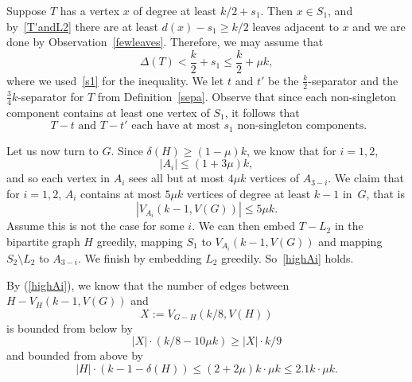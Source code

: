 \documentclass[12pt]{article}
\begin{document}
Suppose $T$ has a vertex $x$ of degree at least $k/2+s_1$. Then $x\in S_1$, and by~\eqref{T'andL2} there are at least $d(x)-s_1\ge k/2$ leaves adjacent to $x$ and we are done by Observation~\ref{fewleaves}.  
Therefore, we may assume that
\begin{equation}\label{DeltaT}
\Delta(T)< \frac k2+s_1\le \frac k2+\mu k,
\end{equation}
where we used~\eqref{s1} for the inequality.
We let $t$ and $t'$ be the $\frac k2$-separator and the $\frac 34k$-separator for $T$ from Definition~\ref{sepa}. Observe that since each non-singleton component contains at least one vertex of $S_1$, it follows that 
\begin{equation}\label{T-tfewcomps}
\text{
 $T-t$ and $T-t'$ each have at most $s_1$ non-singleton components.}
 \end{equation}
 

Let us now turn to $G$. 
Since $\delta(H)\ge (1-\mu)k$, we know that for $i=1,2$, 
\begin{equation}\label{Ai1+3}
|A_i|\le (1+3\mu )k, 
\end{equation}
and so each vertex in $A_i$ 
sees all but at most $4\mu k$ vertices of $A_{3-i}$. 
We claim that for $i=1,2$, $A_i$ contains 
at most $5\mu k$ vertices of degree  at least $k-1$ in~$G$, that is
\begin{equation}\label{highAi}
|V_{A_i}(k-1, V(G))|\le 5\mu k.
\end{equation}
Assume this is not the case for some $i$. 
We can then embed $T-L_2$  in the bipartite graph $H$ greedily, mapping $S_1$  to $V_{A_i}(k-1, V(G))$  and mapping  $S_2\setminus L_2$ to $A_{3-i}$.  We finish by embedding $L_2$ greedily. 
So~\eqref{highAi} holds. 

By (\ref{highAi}), we know that the number of edges between $H-V_{H}(k-1, V(G))$ and $$X:=V_{G-H}(k/8,V(H))$$ is bounded from below by
$$|X|\cdot (k/8-10\mu k)\ge |X|\cdot k/9$$
and bounded from above by
$$|H|\cdot (k-1-\delta(H))\le  (2+2\mu )k\cdot \mu k\le  2.1k\cdot \mu k.$$
\end{document}
